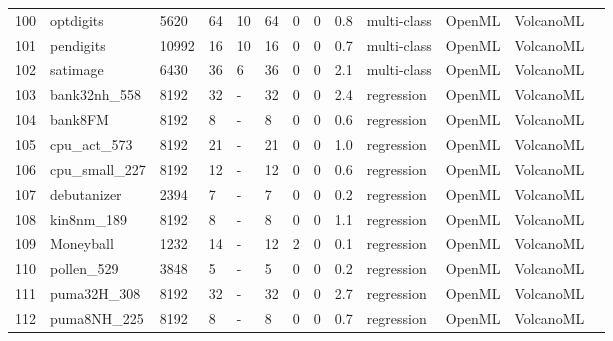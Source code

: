 \begin{table*}
\begin{tabular}{lllllllllllll}
100 & optdigits                                   & 5620    & 64     & 10    & 64    & 0      & 0         & 0.8       & multi-class & OpenML & VolcanoML        \\
101 & pendigits                                   & 10992   & 16     & 10    & 16    & 0      & 0         & 0.7       & multi-class & OpenML & VolcanoML        \\
102 & satimage                                    & 6430    & 36     & 6     & 36    & 0      & 0         & 2.1       & multi-class & OpenML & VolcanoML        \\
103 & bank32nh\_558                               & 8192    & 32     & -     & 32    & 0      & 0         & 2.4       & regression  & OpenML & VolcanoML        \\
104 & bank8FM                                     & 8192    & 8      & -     & 8     & 0      & 0         & 0.6       & regression  & OpenML & VolcanoML        \\
105 & cpu\_act\_573                               & 8192    & 21     & -     & 21    & 0      & 0         & 1.0       & regression  & OpenML & VolcanoML        \\
106 & cpu\_small\_227                             & 8192    & 12     & -     & 12    & 0      & 0         & 0.6       & regression  & OpenML & VolcanoML        \\
107 & debutanizer                                 & 2394    & 7      & -     & 7     & 0      & 0         & 0.2       & regression  & OpenML & VolcanoML        \\
108 & kin8nm\_189                                 & 8192    & 8      & -     & 8     & 0      & 0         & 1.1       & regression  & OpenML & VolcanoML        \\
109 & Moneyball                                   & 1232    & 14     & -     & 12    & 2      & 0         & 0.1       & regression  & OpenML & VolcanoML        \\
110 & pollen\_529                                 & 3848    & 5      & -     & 5     & 0      & 0         & 0.2       & regression  & OpenML & VolcanoML        \\
111 & puma32H\_308                                & 8192    & 32     & -     & 32    & 0      & 0         & 2.7       & regression  & OpenML & VolcanoML        \\
112 & puma8NH\_225                                & 8192    & 8      & -     & 8     & 0      & 0         & 0.7       & regression  & OpenML & VolcanoML        \\

\end{tabular}
\end{table*}
